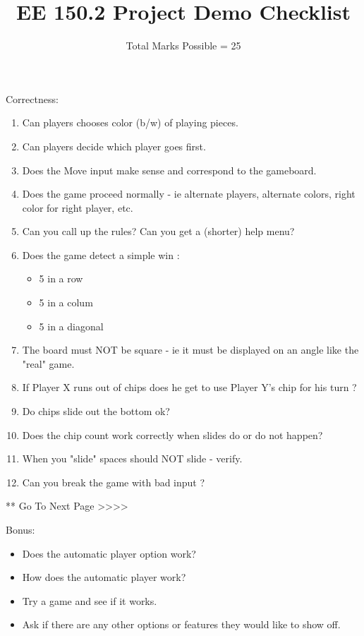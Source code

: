 \setcounter{page}{1}



\title{EE 150.2 Project Demo Checklist}
\author{Total Marks Possible = 25}
\date{}
\maketitle

Correctness:
\begin{enumerate}
\item Can players chooses color (b/w) of playing pieces.
\item Can players decide which player goes first.
\item Does the Move input make sense and correspond to the gameboard.
\item Does the game proceed normally - ie alternate players, alternate colors,
 right color  for right player, etc.
\item Can you call up the rules?  Can you get a (shorter) help menu?
\item Does the game detect  a simple win :
  \begin{itemize}
   \item  5 in a row
   \item 5 in a colum
   \item 5 in a diagonal
  \end{itemize}
\item The board must NOT be square - ie it must be displayed on an angle like
 the "real" game.
\item If Player X runs out of chips does he get to use Player Y's chip for his
 turn ?    
\item Do chips slide out the bottom ok?  
\item Does the chip count work correctly  when slides do or do not happen?
\item When you "slide" spaces should NOT slide - verify.
\item Can you break the game with bad input ?  
\end{enumerate}

** Go To Next Page >>>>
\newpage

Bonus:
\begin{itemize}
\item [A.] Does the automatic player option work?
\item [B.] How does the automatic player work? 
\item [C.] Try a game and see if it works.
\item [D.] Ask if there are any other options or features they would
like to show off.
\end{itemize}

